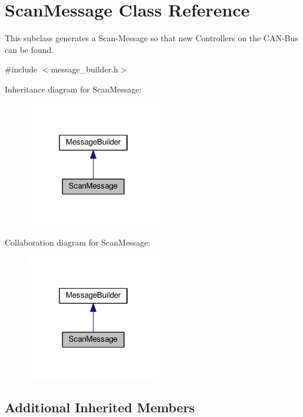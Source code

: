 \hypertarget{classScanMessage}{}\section{Scan\+Message Class Reference}
\label{classScanMessage}


This subclass generates a Scan-\/\+Message so that new Controllers on the C\+A\+N-\/\+Bus can be found.  




{\ttfamily \#include $<$message\+\_\+builder.\+h$>$}



Inheritance diagram for Scan\+Message\+:\nopagebreak
\begin{figure}[H]
\begin{center}
\leavevmode
\includegraphics[width=166pt]{classScanMessage__inherit__graph}
\end{center}
\end{figure}


Collaboration diagram for Scan\+Message\+:\nopagebreak
\begin{figure}[H]
\begin{center}
\leavevmode
\includegraphics[width=166pt]{classScanMessage__coll__graph}
\end{center}
\end{figure}
\subsection*{Additional Inherited Members}



